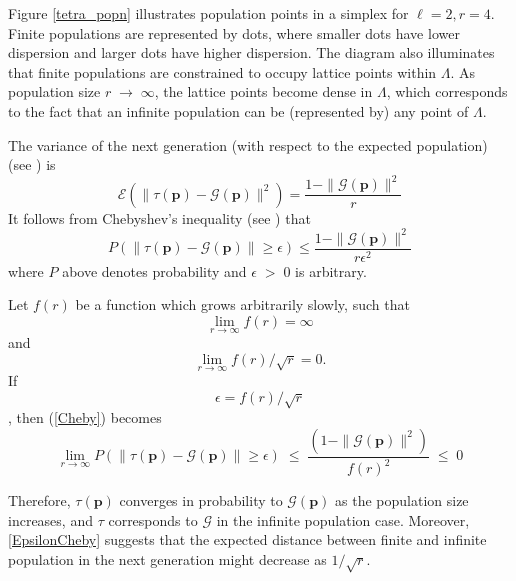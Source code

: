 Figure \ref{tetra_popn} illustrates population points in a simplex for $\ell  =  2,  r  =  4$. 
Finite populations are represented by dots, 
where smaller dots have lower dispersion and larger dots have higher dispersion. 
The diagram also illuminates that finite populations are constrained to occupy lattice points 
within $\Lambda$. As population size $r \;\to\; \infty$, the lattice points become dense in $\Lambda$, 
which corresponds to the fact that an infinite population can be (represented by) any point of $\Lambda$.  

The variance of the next generation (with respect to the expected population) (see \cite{Vose1999}) is 
\begin{equation}
\label{RHSvariance}
\mathcal{E}(\| \tau (\bm{p}) - \mathcal{G}(\bm{p}) \|^2) = \frac{1 - \|\mathcal{G}(\bm{p})\|^2}{r}
\end{equation}
It follows from Chebyshev's inequality (see \cite{ChebyshevInequality}) that 
\begin{equation}
\label{Cheby}
P(\| \tau (\bm{p}) - \mathcal{G}(\bm{p}) \| \geq \epsilon) \leq \frac{1 - \|\mathcal{G}(\bm{p})\|^2} {r{\epsilon}^2}
\end{equation}
where $P$ above denotes probability and $\epsilon \;>\; 0$ is arbitrary.

Let $f(r)$ be a function which grows arbitrarily slowly, such that 
\[
\lim_{r \to \infty} f(r)  =  \infty
\]
and
\[
\lim_{r \to \infty} f(r)/\sqrt{r}  =  0.
\]
If 
\begin{equation}
\label{EpsilonCheby}
\epsilon  =  f(r)/\sqrt{r}
\end{equation}
, then (\ref{Cheby}) becomes
\begin{equation*}
\lim_{r \to \infty} P(\| \tau (\bm{p}) - \mathcal{G}(\bm{p}) \| \geq \epsilon) \; \leq \; \frac{(1 - \|\mathcal{G}(\bm{p})\|^2)} {{f(r)}^2} \; \leq \; 0
\end{equation*}

Therefore, $\tau(\bm{p})$ converges in probability to $\mathcal{G}(\bm{p})$ as the population size increases, 
and $\tau$ corresponds to $\mathcal{G}$ 
in the infinite population case. Moreover, \ref{EpsilonCheby} suggests that the expected distance between finite and 
infinite population in the next generation might decrease as $1/\sqrt{r}$.

